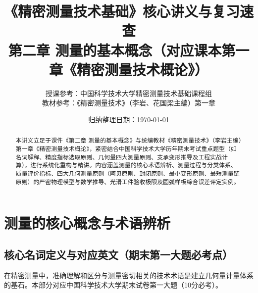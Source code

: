 \documentclass[11pt,a4paper]{ctexart}
\title{\LARGE\bfseries 《精密测量技术基础》核心讲义与复习速查\\
\vspace{4pt}
\Large\kaishu 第二章 测量的基本概念（对应课本第一章《精密测量技术概论》）}
\author{\small 授课参考：中国科学技术大学精密测量技术基础课程组 \\
\small 教材参考：《精密测量技术》（李岩、花国梁主编）第一章}
\date{\small 归纳整理日期：\today}
\begin{document}
\maketitle
\thispagestyle{fancy}

\begin{abstract}
本讲义立足于课件《第二章 测量的基本概念》与统编教材《精密测量技术》（李岩主编）第一章《精密测量技术概论》，紧密结合中国科学技术大学历年期末考试重点题型（如名词解释、精度指标选取原则、几何量四大测量原则、支承变形推导及工程实战计算），进行系统化重构与精讲。内容涵盖测量的核心术语辨析、测量过程与分类体系、质量评价指标、四大几何测量原则（阿贝原则、封闭原则、最小变形原则、最短测量链原则）的严密物理模型与数学推导、光滑工件验收极限及圆弧样板综合误差评定实例。
\end{abstract}

\tableofcontents
\newpage

\section{测量的核心概念与术语辨析}

\subsection{核心名词定义与对应英文（期末第一大题必考点）}
在精密测量中，准确理解和区分与测量密切相关的技术术语是建立几何量计量体系的基石。本部分对应中国科学技术大学期末试卷第一大题（10分必考）。
\end{document}
